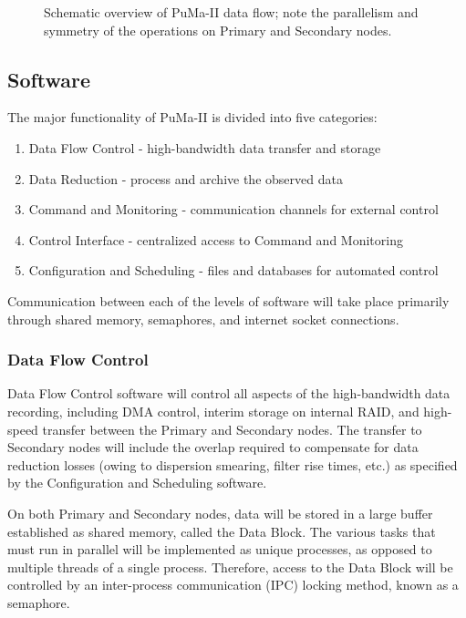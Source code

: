 \begin{figure}
\centerline{}
\caption [\sffamily PuMa-II Data Flow]
{
Schematic overview of PuMa-II data flow; note the parallelism and 
symmetry of the operations on Primary and Secondary nodes.
}
\label{fig:layout}
\end{figure}

\subsection{Software}

The major functionality of PuMa-II is divided into five categories:

\begin{enumerate}

\item Data Flow Control - high-bandwidth data transfer and storage
\item Data Reduction - process and archive the observed data
\item Command and Monitoring - communication channels for external control
\item Control Interface - centralized access to Command and Monitoring
\item Configuration and Scheduling - files and databases for automated control

\end{enumerate}

Communication between each of the levels of software will take place
primarily through shared memory, semaphores, and internet socket
connections.

\subsubsection{Data Flow Control}

Data Flow Control software will control all aspects of the
high-bandwidth data recording, including DMA control, interim storage
on internal RAID, and high-speed transfer between the Primary and
Secondary nodes.  The transfer to Secondary nodes will include the
overlap required to compensate for data reduction losses (owing to
dispersion smearing, filter rise times, etc.) as specified by the
Configuration and Scheduling software.

On both Primary and Secondary nodes, data will be stored in a large
buffer established as shared memory, called the Data Block.  The
various tasks that must run in parallel will be implemented as unique
processes, as opposed to multiple threads of a single process.
Therefore, access to the Data Block will be controlled by an
inter-process communication (IPC) locking method, known as a
semaphore.

